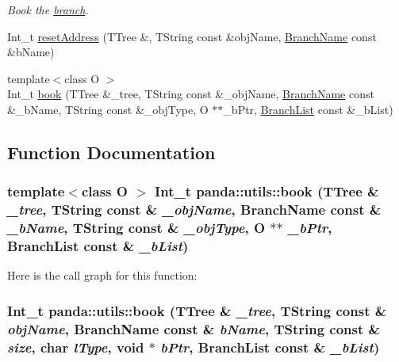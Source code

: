 \begin{DoxyCompactItemize}
\begin{DoxyCompactList}\small\item\em Book the \hyperlink{namespacepanda_1_1branch}{branch}. \item\end{DoxyCompactList}\item 
Int\_\-t \hyperlink{namespacepanda_1_1utils_a82a8530e64fbdf917cf9b8659065f98b}{resetAddress} (TTree \&, TString const \&objName, \hyperlink{classpanda_1_1utils_1_1BranchName}{BranchName} const \&bName)
\item 
{\footnotesize template$<$class O $>$ }\\Int\_\-t \hyperlink{namespacepanda_1_1utils_aa19d897bd5e032044ceac8b4eae43409}{book} (TTree \&\_\-tree, TString const \&\_\-objName, \hyperlink{classpanda_1_1utils_1_1BranchName}{BranchName} const \&\_\-bName, TString const \&\_\-objType, O $\ast$$\ast$\_\-bPtr, \hyperlink{classpanda_1_1utils_1_1BranchList}{BranchList} const \&\_\-bList)
\end{DoxyCompactItemize}


\subsection{Function Documentation}
\hypertarget{namespacepanda_1_1utils_aa19d897bd5e032044ceac8b4eae43409}{
\subsubsection[{book}]{\setlength{\rightskip}{0pt plus 5cm}template$<$class O $>$ Int\_\-t panda::utils::book (TTree \& {\em \_\-tree}, \/  TString const \& {\em \_\-objName}, \/  BranchName const \& {\em \_\-bName}, \/  TString const \& {\em \_\-objType}, \/  O $\ast$$\ast$ {\em \_\-bPtr}, \/  BranchList const \& {\em \_\-bList})}}
\label{namespacepanda_1_1utils_aa19d897bd5e032044ceac8b4eae43409}


Here is the call graph for this function:\hypertarget{namespacepanda_1_1utils_aaa6c7cd5892388e6ffdf713b11abf793}{
\subsubsection[{book}]{\setlength{\rightskip}{0pt plus 5cm}Int\_\-t panda::utils::book (TTree \& {\em \_\-tree}, \/  TString const \& {\em objName}, \/  BranchName const \& {\em bName}, \/  TString const \& {\em size}, \/  char {\em lType}, \/  void $\ast$ {\em bPtr}, \/  BranchList const \& {\em \_\-bList})}}
\label{namespacepanda_1_1utils_aaa6c7cd5892388e6ffdf713b11abf793}


